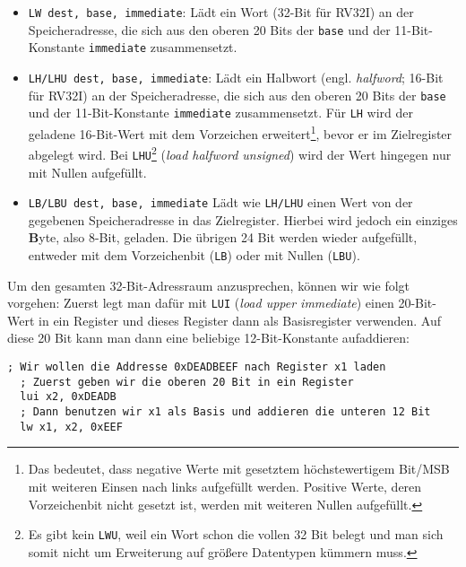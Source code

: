 \begin{itemize}
  \item \lstinline[style=risc-v_Assembler]!LW dest, base, immediate!: Lädt ein Wort (32-Bit für RV32I) an der
    Speicheradresse, die sich aus den oberen 20 Bits der \lstinline[style=risc-v_Assembler]!base! und der
    11-Bit-Konstante \lstinline[style=risc-v_Assembler]!immediate! zusammensetzt.
  \item\lstinline[style=risc-v_Assembler]!LH/LHU dest, base, immediate!: Lädt ein Halbwort
    (engl. \emph{halfword}; 16-Bit für RV32I) an der Speicheradresse, die sich
    aus den oberen 20 Bits der \lstinline[style=risc-v_Assembler]!base! und der 11-Bit-Konstante
    \lstinline[style=risc-v_Assembler]!immediate! zusammensetzt. Für \lstinline[style=risc-v_Assembler]!LH! wird der geladene 16-Bit-Wert
    mit dem Vorzeichen erweitert\footnote{Das bedeutet, dass negative Werte mit gesetztem höchstewertigem Bit/MSB
      mit weiteren Einsen nach links aufgefüllt werden. Positive Werte, deren
      Vorzeichenbit nicht gesetzt ist, werden mit weiteren Nullen aufgefüllt.}, bevor er im
    Zielregister abgelegt wird. Bei \lstinline[style=risc-v_Assembler]!LHU!\footnote{Es gibt kein \lstinline[style=risc-v_Assembler]!LWU!,
      weil ein Wort schon die vollen 32 Bit belegt und man sich somit nicht um
      Erweiterung auf größere Datentypen kümmern muss.} (\emph{load halfword
      unsigned}) wird der Wert hingegen nur mit Nullen aufgefüllt.
  \item \lstinline[style=risc-v_Assembler]!LB/LBU dest, base, immediate! Lädt wie \lstinline[style=risc-v_Assembler]!LH/LHU! einen Wert von
    der gegebenen Speicheradresse in das Zielregister. Hierbei wird jedoch ein
    einziges \textbf{B}yte, also 8-Bit, geladen. Die übrigen 24 Bit werden wieder
    aufgefüllt, entweder mit dem Vorzeichenbit (\lstinline[style=risc-v_Assembler]!LB!) oder mit Nullen
    (\lstinline[style=risc-v_Assembler]!LBU!).
\end{itemize}

Um den gesamten 32-Bit-Adressraum anzusprechen, können wir wie folgt vorgehen: 
Zuerst legt man dafür mit \lstinline[style=risc-v_Assembler]!LUI! (\emph{load upper immediate}) einen 20-Bit-Wert
in ein Register und dieses Register dann als Basisregister
verwenden. Auf diese 20 Bit kann man dann eine beliebige 12-Bit-Konstante
aufaddieren:

\begin{lstlisting}[style=risc-v_Assembler]
  ; Wir wollen die Addresse 0xDEADBEEF nach Register x1 laden
  ; Zuerst geben wir die oberen 20 Bit in ein Register
  lui x2, 0xDEADB
  ; Dann benutzen wir x1 als Basis und addieren die unteren 12 Bit
  lw x1, x2, 0xEEF
\end{lstlisting}


